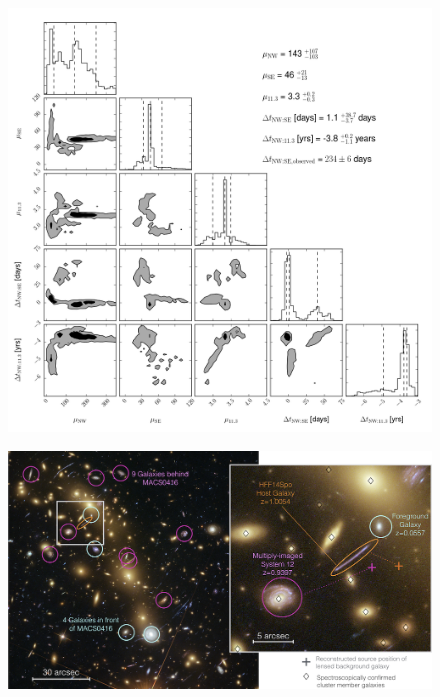 \begin{supplementary}











\begin{figure}[tbp]
  \begin{center}
    \includegraphics[width=\textwidth]{composite_lens_model_contours}
    \caption{ \protect}
  \end{center}
\end{figure}

\begin{figure}[tbp]
  \begin{center}
    \includegraphics[width=\textwidth]{macs0416_lineofsight_lensing.png}
    \caption{\protect}
  \end{center}
\end{figure}


\end{supplementary}
